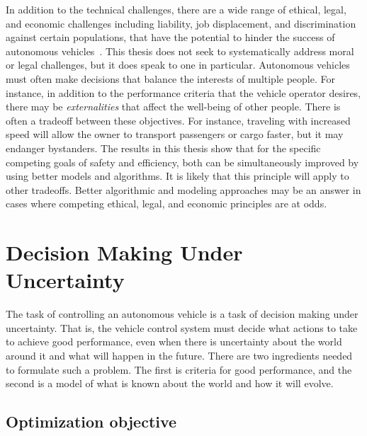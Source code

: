In addition to the technical challenges, there are a wide range of ethical, legal, and economic challenges including liability, job displacement, and discrimination against certain populations, that have the potential to hinder the success of autonomous vehicles~\cite{casey2016amoral}.
This thesis does not seek to systematically address moral or legal challenges, but it does speak to one in particular.
Autonomous vehicles must often make decisions that balance the interests of multiple people.
For instance, in addition to the performance criteria that the vehicle operator desires, there may be \emph{externalities} that affect the well-being of other people.
There is often a tradeoff between these objectives.
For instance, traveling with increased speed will allow the owner to transport passengers or cargo faster, but it may endanger bystanders.
The results in this thesis show that for the specific competing goals of safety and efficiency, both can be simultaneously improved by using better models and algorithms.
It is likely that this principle will apply to other tradeoffs.
Better algorithmic and modeling approaches may be an answer in cases where competing ethical, legal, and economic principles are at odds.

% 

\section{Decision Making Under Uncertainty}

The task of controlling an autonomous vehicle is a task of decision making under uncertainty.
That is, the vehicle control system must decide what actions to take to achieve good performance, even when there is uncertainty about the world around it and what will happen in the future.
There are two ingredients needed to formulate such a problem.
The first is criteria for good performance, and the second is a model of what is known about the world and how it will evolve.

\subsection{Optimization objective}


